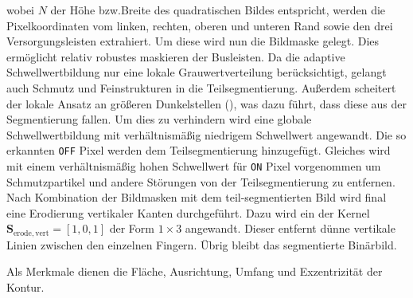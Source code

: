 wobei \(N\) der Höhe bzw.\@ Breite des quadratischen Bildes entspricht, werden die Pixelkoordinaten vom linken, rechten, oberen und unteren Rand sowie den drei Versorgungsleisten extrahiert. Um diese wird nun die Bildmaske gelegt. Dies ermöglicht relativ robustes maskieren der Busleisten. Da die adaptive Schwellwertbildung nur eine lokale Grauwertverteilung berücksichtigt, gelangt auch Schmutz und Feinstrukturen in die Teilsegmentierung. Außerdem scheitert der lokale Ansatz an größeren Dunkelstellen (), was dazu führt, dass diese aus der Segmentierung fallen. Um dies zu verhindern wird eine globale Schwellwertbildung mit verhältnismäßig niedrigem Schwellwert angewandt. Die so erkannten \texttt{\foreignlanguage{english}{OFF}} Pixel werden dem Teilsegmentierung hinzugefügt. Gleiches wird mit einem verhältnismäßig hohen Schwellwert für \texttt{\foreignlanguage{english}{ON}} Pixel vorgenommen um Schmutzpartikel und andere Störungen von der Teilsegmentierung zu entfernen. Nach Kombination der Bildmasken mit dem teil-segmentierten Bild wird final eine Erodierung vertikaler Kanten durchgeführt. Dazu wird ein der Kernel \(\boldsymbol{S}_{\mathrm{erode},\mathrm{vert}} = {\left[ 1, 0, 1 \right]}\) der Form \(1 \times 3\) angewandt. Dieser entfernt dünne vertikale Linien zwischen den einzelnen Fingern. Übrig bleibt das segmentierte Binärbild.

Als Merkmale dienen die Fläche, Ausrichtung, Umfang und Exzentrizität der Kontur.

